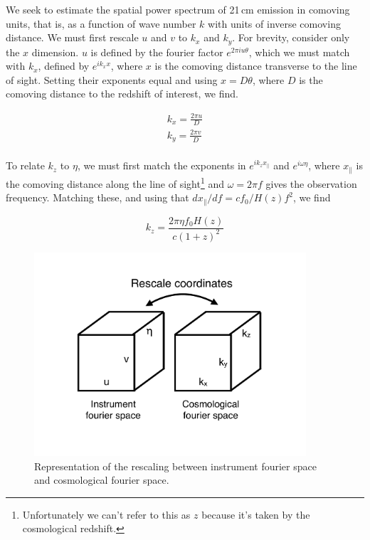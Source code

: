 We seek to estimate the spatial power spectrum of 21\,cm emission in comoving units, that is, as a function of wave number $k$ with units of inverse comoving distance. We must first rescale $u$ and $v$ to $k_x$ and $k_y$. For brevity, consider only the $x$ dimension. $u$ is defined by the fourier factor $e^{2\pi i u\theta}$, which we must match with $k_x$, defined by $e^{ik_x x}$, where $x$ is the comoving distance transverse to the line of sight. Setting their exponents equal and using $x=D\theta$, where $D$ is the comoving distance to the redshift of interest, we find.

\begin{eqnarray}
	k_x=\frac{2\pi u}{D} \\ 
	k_y=\frac{2\pi v}{D} \\ 
\end{eqnarray}

To relate $k_z$ to $\eta$, we must first match the exponents in $e^{i k_z x_\parallel}$ and $e^{i\omega \eta}$, where $x_\parallel$ is the comoving distance along the line of sight\footnote{Unfortunately we can't refer to this as $z$ because it's taken by the cosmological redshift.} and $\omega=2\pi f$ gives the observation frequency. Matching these, and using that $d x_\parallel/df=cf_0/H(z)f^2$, we find

\begin{equation}
	k_z=\frac{2\pi\eta f_0 H(z)}{c(1+z)^2}
\end{equation}

\begin{figure}[h]
    \centering
    \includegraphics[width=0.9\textwidth]{chap0_intro/ifo_space_cosmo.pdf}
    \caption{Representation of the rescaling between instrument fourier space and cosmological fourier space.}
    \label{fig:ifospacecosmo}
\end{figure}

